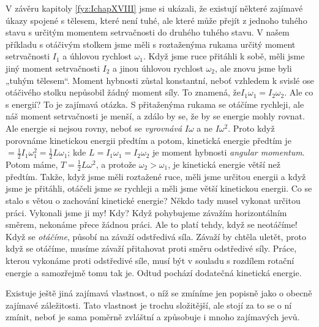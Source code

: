     V závěru kapitoly \ref{fyz:IchapXVIII} jsme si ukázali, že existují některé zajímavé úkazy
    spojené s tělesem, které není tuhé, ale které může přejít z jednoho tuhého stavu s určitým
    momentem setrvačnosti do druhého tuhého stavu. V našem příkladu s otáčivým stolkem jsme měli s
    roztaženýma rukama určitý moment setrvačnosti \(I_1\) a úhlovou rychlost \(\omega_1\). Když jsme
    ruce přitáhli k sobě, měli jsme jiný moment setrvačnosti \(I_2\) a jinou úhlovou rychlost
    \(\omega_2\), ale znovu jsme byli „tuhým tělesem“. Moment hybnosti zůstal konstantní, neboť
    vzhledem k svislé ose otáčivého stolku nepůsobil žádný moment síly. To znamená,
    že\(I_1ω_1=I_2ω_2\). Ale co s energií? To je zajímavá otázka. S přitaženýma rukama se otáčíme
    rychleji, ale náš moment setrvačnosti je menší, a zdálo by se, že by se energie mohly rovnat.
    Ale energie si nejsou rovny, neboť se \emph{vyrovnává} \(I\omega\) a ne \(I\omega^2\). Proto
    když porovnáme kinetickou energii předtím a potom, kinetická energie předtím je
    \(=\frac{1}{2}I_1ω^2_1=\frac{1}{2}Lω_1\); kde \(L=I_1ω_1= I_2ω_2\) je moment hybnosti
    \emph{angular momentum}. Potom máme, \(T=\frac{1}{2}Lω^2\), a protože \(ω_2>ω_1\), je kinetická
    energie větší než předtím. Takže, když jsme měli roztažené ruce, měli jsme určitou energii a
    když jsme je přitáhli, otáčeli jsme se rychleji a měli jsme větší kinetickou energii. Co se
    stalo s větou o zachování kinetické energie? Někdo tady musel vykonat určitou práci. Vykonali
    jsme ji my! Kdy? Když pohybujeme závažím horizontálním směrem, nekonáme přece žádnou práci. Ale
    to platí tehdy, když se neotáčíme! Když se \emph{otáčíme}, působí na závaží odstředivá síla.
    Závaží by chtěla uletět, proto když se otáčíme, musíme závaží přitahovat proti směru odstředivé
    síly. Práce, kterou vykonáme proti odstředivé síle, musí být v souladu s rozdílem rotační
    energie a samozřejmě tomu tak je. Odtud pochází dodatečná kinetická energie.
    
    Existuje ještě jiná zajímavá vlastnost, o níž se zmíníme jen popisně jako o obecně zajímavé
    záležitosti. Tato vlastnost je trochu složitější, ale stojí za to se o ní zmínit, neboť je sama
    poměrně zvláštní a způsobuje i mnoho zajímavých jevů.    

